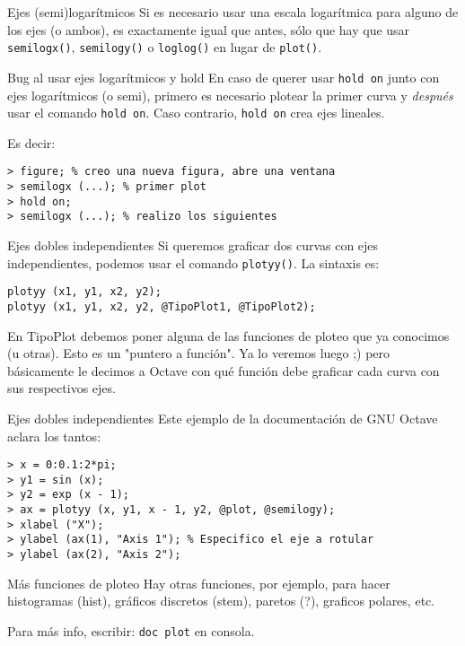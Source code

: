 \begin{frame}[fragile]{Ejes (semi)logarítmicos}
Si es necesario usar una escala logarítmica para alguno de los ejes (o ambos), es exactamente igual que antes, sólo que hay que usar \verb$semilogx()$, \verb$semilogy()$ o \verb$loglog()$ en lugar de \verb$plot()$.

\begin{alertblock}{Bug al usar ejes logarítmicos y hold}
En caso de querer usar \verb$hold on$ junto con ejes logarítmicos (o semi), primero es necesario plotear la primer curva y \emph{después} usar el comando \verb$hold on$. Caso contrario, \verb$hold on$ crea ejes lineales.
\end{alertblock}

Es decir:

\begin{lstlisting}
> figure; % creo una nueva figura, abre una ventana
> semilogx (...); % primer plot
> hold on;
> semilogx (...); % realizo los siguientes
\end{lstlisting}
\end{frame}

\begin{frame}[fragile]{Ejes dobles independientes}
Si queremos graficar dos curvas con ejes independientes, podemos usar el comando \verb$plotyy()$. La sintaxis es:

\begin{lstlisting}
plotyy (x1, y1, x2, y2);
plotyy (x1, y1, x2, y2, @TipoPlot1, @TipoPlot2);
\end{lstlisting}

En TipoPlot debemos poner alguna de las funciones de ploteo que ya conocimos (u otras). Esto es un "puntero a función". Ya lo veremos luego ;) pero básicamente le decimos a Octave con qué función debe graficar cada curva con sus respectivos ejes.
\end{frame}

\begin{frame}[fragile]{Ejes dobles independientes}
Este ejemplo de la documentación de GNU Octave aclara los tantos:

\begin{lstlisting}
> x = 0:0.1:2*pi;
> y1 = sin (x);
> y2 = exp (x - 1);
> ax = plotyy (x, y1, x - 1, y2, @plot, @semilogy);
> xlabel ("X");
> ylabel (ax(1), "Axis 1"); % Especifico el eje a rotular
> ylabel (ax(2), "Axis 2");
\end{lstlisting}
\end{frame}

\begin{frame}[fragile]{Más funciones de ploteo}
Hay otras funciones, por ejemplo, para hacer histogramas (hist), gráficos discretos (stem), paretos (?), graficos polares, etc.

Para más info, escribir: \verb$doc plot$ en consola.
\end{frame}



